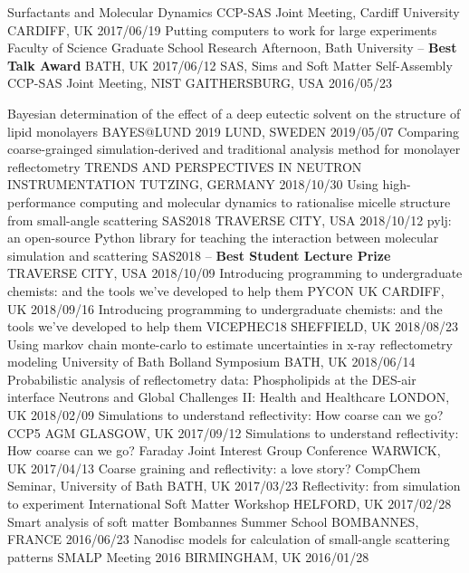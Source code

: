 \begin{cvhonors}
  \cvhonor
    {Surfactants and Molecular Dynamics}
    {CCP-SAS Joint Meeting, Cardiff University}
    {CARDIFF, UK}
    {2017/06/19}
  \cvhonor
  	{Putting computers to work for large experiments}
    {Faculty of Science Graduate School Research Afternoon, Bath University -- \textbf{Best Talk Award}}
    {BATH, UK}
    {2017/06/12}
  \cvhonor
    {SAS, Sims and Soft Matter Self-Assembly}
    {CCP-SAS Joint Meeting, NIST}
    {GAITHERSBURG, USA}
    {2016/05/23}
\end{cvhonors}
\begin{cvhonors}
  \cvhonor
    {Bayesian determination of the effect of a deep eutectic solvent on the structure of lipid monolayers}
    {BAYES@LUND 2019}
    {LUND, SWEDEN}
    {2019/05/07}
  \cvhonor
    {Comparing coarse-grainged simulation-derived and traditional analysis method for monolayer reflectometry}
    {TRENDS AND PERSPECTIVES IN NEUTRON INSTRUMENTATION}
    {TUTZING, GERMANY}
    {2018/10/30}
  \cvhonor
    {Using high-performance computing and molecular dynamics to rationalise micelle structure from small-angle scattering}
    {SAS2018}
    {TRAVERSE CITY, USA}
    {2018/10/12}
  \cvhonor
    {pylj: an open-source Python library for teaching the interaction between molecular simulation and scattering}
	{SAS2018 -- \textbf{Best Student Lecture Prize}}
    {TRAVERSE CITY, USA}
    {2018/10/09}
  \cvhonor
    {Introducing programming to undergraduate chemists: and the tools we've developed to help them}
    {PYCON UK}
    {CARDIFF, UK}
    {2018/09/16}
  \cvhonor
    {Introducing programming to undergraduate chemists: and the tools we've developed to help them}
    {VICEPHEC18}
    {SHEFFIELD, UK}
    {2018/08/23}
  \cvhonor
    {Using markov chain monte-carlo to estimate uncertainties in x-ray reflectometry modeling}
    {University of Bath Bolland Symposium}
    {BATH, UK}
    {2018/06/14}
  \cvhonor
    {Probabilistic analysis of reflectometry data: Phospholipids at the DES-air interface}
    {Neutrons and Global Challenges II: Health and Healthcare}
    {LONDON, UK}
    {2018/02/09}
  \cvhonor
    {Simulations to understand reflectivity: How coarse can we go?}
    {CCP5 AGM}
    {GLASGOW, UK}
    {2017/09/12}
  \cvhonor
  	{Simulations to understand reflectivity: How coarse can we go?}
    {Faraday Joint Interest Group Conference}
    {WARWICK, UK}
    {2017/04/13}
  \cvhonor
  	{Coarse graining and reflectivity: a love story?}
    {CompChem Seminar, University of Bath}
    {BATH, UK}
    {2017/03/23}
  \cvhonor
  	{Reflectivity: from simulation to experiment}
    {International Soft Matter Workshop}
    {HELFORD, UK}
    {2017/02/28}
  \cvhonor
    {Smart analysis of soft matter}
    {Bombannes Summer School}
    {BOMBANNES, FRANCE}
    {2016/06/23}
  \cvhonor
    {Nanodisc models for calculation of small-angle scattering patterns}
    {SMALP Meeting 2016}
    {BIRMINGHAM, UK}
    {2016/01/28}
\end{cvhonors}
